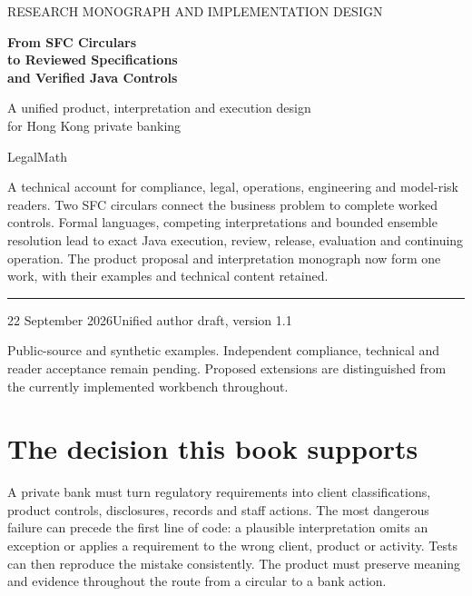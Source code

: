 \documentclass[12pt,a4paper,oneside,openany]{book}
\begin{document}
\raggedbottom
\frontmatter
\hypersetup{pageanchor=false}
\begin{titlepage}
\vspace*{15mm}
{\sffamily\color{teal}\large RESEARCH MONOGRAPH AND IMPLEMENTATION DESIGN\par}
\vspace{12mm}
{\sffamily\bfseries\color{navy}\fontsize{32}{37}\selectfont From SFC Circulars\\to Reviewed Specifications\\and Verified Java Controls\par}
\vspace{12mm}
{\Large A unified product, interpretation and execution design\\for Hong Kong private banking\par}
\vspace{12mm}
{\large LegalMath\par}
\vfill
\begin{minipage}{0.94\textwidth}
A technical account for compliance, legal, operations, engineering and model-risk
readers. Two SFC circulars connect the business problem to complete worked
controls. Formal languages, competing interpretations and bounded ensemble
resolution lead to exact Java execution, review, release, evaluation and
continuing operation. The product proposal and interpretation monograph now
form one work, with their examples and technical content retained.
\end{minipage}
\vspace{16mm}
\hrule
\vspace{5mm}
22 September 2026\hfill Unified author draft, version 1.1\par
\small Public-source and synthetic examples. Independent compliance, technical
and reader acceptance remain pending. Proposed extensions are distinguished
from the currently implemented workbench throughout.
\end{titlepage}
\hypersetup{pageanchor=true}
\chapter*{The decision this book supports}
A private bank must turn regulatory requirements into client classifications,
product controls, disclosures, records and staff actions. The most dangerous
failure can precede the first line of code: a plausible interpretation omits an
exception or applies a requirement to the wrong client, product or activity.
Tests can then reproduce the mistake consistently. The product must preserve
meaning and evidence throughout the route from a circular to a bank action.
\end{document}
